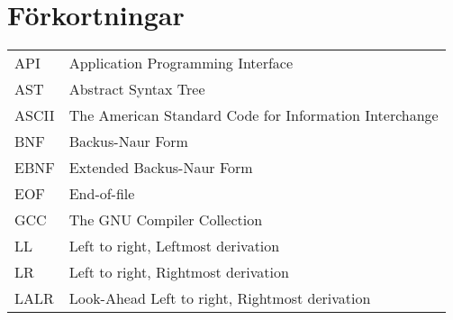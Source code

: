 \section*{Förkortningar}

\begin{tabular}{l l}
  API & Application Programming Interface \\
  AST & Abstract Syntax Tree \\
  ASCII & The American Standard Code for Information Interchange \\
  BNF & Backus-Naur Form \\
  EBNF & Extended Backus-Naur Form \\
  EOF & End-of-file \\
  GCC & The GNU Compiler Collection \\
  LL & Left to right, Leftmost derivation \\
  LR & Left to right, Rightmost derivation \\
  LALR & Look-Ahead Left to right, Rightmost derivation
\end{tabular}

\clearpage
